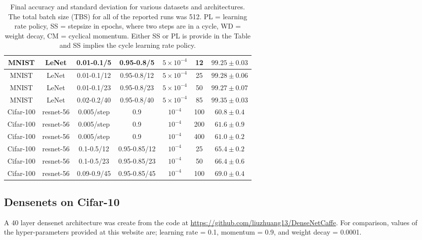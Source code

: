 \documentclass{article} %
\begin{document}
\begin{table}[tb]
\begin{center}
\begin{tabular}{| c | c | c | c | c | c | c | }
			MNIST  & LeNet & 0.01-0.1/5  & 0.95-0.8/5 & $5 \times 10^{-4}$  &  12 & $ 99.25  \pm 0.03 $   \\ \hline
			MNIST  & LeNet & 0.01-0.1/12  & 0.95-0.8/12 & $5 \times 10^{-4}$  &  25 & $ 99.28  \pm 0.06 $   \\ \hline
			MNIST  & LeNet & 0.01-0.1/23  & 0.95-0.8/23 & $5 \times 10^{-4}$  &  50 & $ 99.27  \pm 0.07 $   \\ \hline
			MNIST  & LeNet & 0.02-0.2/40  & 0.95-0.8/40 & $5 \times 10^{-4}$  &  85 & $ 99.35  \pm 0.03 $   \\ \hline
			\hline   
			Cifar-100 & resnet-56 & 0.005/step & 0.9  & $10^{-4}$  &  100 & $ 60.8 \pm 0.4 $   \\ \hline
			Cifar-100 & resnet-56 & 0.005/step & 0.9  & $10^{-4}$  &  200 & $ 61.6 \pm 0.9 $   \\ \hline
			Cifar-100 & resnet-56 & 0.005/step & 0.9  & $10^{-4}$  &  400 & $ 61.0 \pm 0.2 $   \\ \hline
			Cifar-100 & resnet-56 & 0.1-0.5/12 & 0.95-0.85/12 & $10^{-4}$  &  25 & $ 65.4 \pm 0.2 $   \\ \hline
			Cifar-100 & resnet-56 & 0.1-0.5/23 & 0.95-0.85/23 & $10^{-4}$  &  50 & $ 66.4 \pm 0.6 $   \\ \hline
			Cifar-100 & resnet-56 & 0.09-0.9/45 & 0.95-0.85/45 & $10^{-4}$  &  100 & $ 69.0 \pm 0.4 $   \\ \hline
		\end{tabular}
		\vspace{10pt}
		\caption{Final accuracy and standard deviation for various datasets and architectures.  The total batch size (TBS) for all of the reported runs was 512.  PL = learning rate policy, SS = stepsize in epochs, where two steps are in a cycle, WD = weight decay, CM = cyclical momentum. Either SS or PL is provide in the Table and SS implies the cycle learning rate policy. }
		\label{tab:otherExamples}
	\end{center}
	\vspace{-20pt}
\end{table}

\subsection{Densenets on Cifar-10}
\label{sec:dense}

A 40 layer densenet architecture was create from the code at \url{https://github.com/liuzhuang13/DenseNetCaffe}.   For comparison, values of the hyper-parameters provided at this website are; learning rate = 0.1, momentum = 0.9, and weight decay = 0.0001. 
\end{document}

